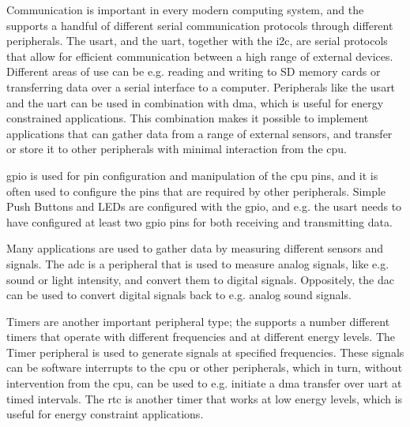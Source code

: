 Communication is important in every modern computing system, and the {\gecko} supports a handful of different serial communication protocols through different peripherals.
The \gls{usart}, and the \gls{uart}, together with the \gls{i2c}, are serial protocols that allow for efficient communication between a high range of external devices.
Different areas of use can be e.g. reading and writing to SD memory cards or transferring data over a serial interface to a computer.
Peripherals like the \gls{usart} and the \gls{uart} can be used in combination with \gls{dma}, which is useful for energy constrained applications.
This combination makes it possible to implement applications that can gather data from a range of external sensors, and transfer or store it to other peripherals with minimal interaction from the \gls{cpu}.

\gls{gpio} is used for pin configuration and manipulation of the \gls{cpu} pins, and it is often used to configure the pins that are required by other peripherals.
Simple Push Buttons and LEDs are configured with the \gls{gpio}, and e.g. the \gls{usart} needs to have configured at least two \gls{gpio} pins for both receiving and transmitting data.

Many applications are used to gather data by measuring different sensors and signals.
The \gls{adc} is a peripheral that is used to measure analog signals, like e.g. sound or light intensity, and convert them to digital signals.
Oppositely, the \gls{dac} can be used to convert digital signals back to e.g. analog sound signals.

Timers are another important peripheral type; the {\gecko} supports a number different timers that operate with different frequencies and at different energy levels.
The Timer peripheral is used to generate signals at specified frequencies.
These signals can be software interrupts to the \gls{cpu} or other peripherals, which in turn, without intervention from the \gls{cpu}, can be used to e.g. initiate a \gls{dma} transfer over \gls{uart} at timed intervals.
The \gls{rtc} is another timer that works at low energy levels, which is useful for energy constraint applications.
